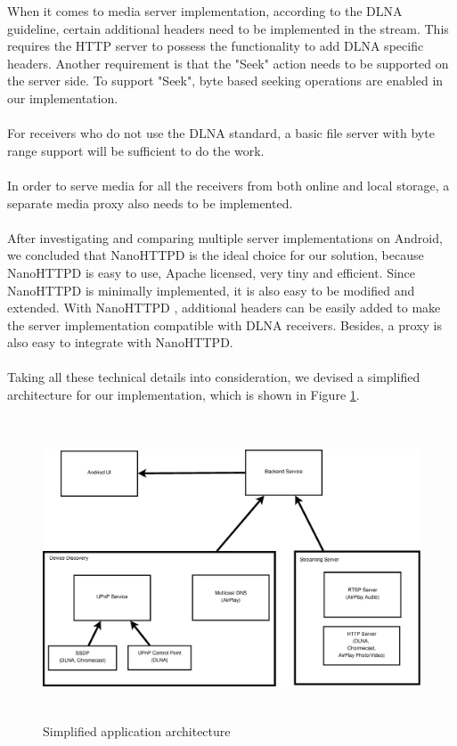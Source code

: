 When it comes to media server implementation, according to the DLNA guideline,
certain additional headers need to be implemented in the stream. This
requires the HTTP server to possess the functionality to add DLNA specific
headers. Another requirement is that the "Seek" action needs to be supported on the server side. To support "Seek", byte based seeking operations are enabled in our implementation.\\
\\
For receivers who do not use the DLNA standard, a basic file server with byte range support will be sufficient to do the work.\\
\\
In order to serve media for all the receivers from both online and local storage, a separate media proxy also needs to be implemented.\\
\\
After investigating and comparing multiple server implementations on Android, we
concluded that NanoHTTPD is the ideal choice for our solution, because NanoHTTPD is easy to use,
Apache licensed, very tiny and efficient. Since NanoHTTPD is minimally implemented, it is also easy to be modified and extended. With NanoHTTPD , additional headers can be easily added to make the server implementation compatible with DLNA receivers. Besides, a proxy is also easy to integrate with  NanoHTTPD.\\
\\
Taking all these technical details into consideration, we devised a simplified
architecture for our implementation, which is shown in Figure \ref{chart3}.
\begin{figure}[htb]
\centering \includegraphics[height=9cm]{charts/chart3}
\caption{Simplified application architecture\label{chart3}}
\end{figure}\\
